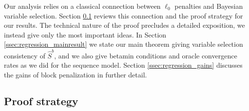 \documentclass[aos]{imsart}
\theoremstyle{plain}
\newcommand{\david}[1]{{\small{\color{blue} \sf $\heartsuit$ David: #1}}}
\newcommand{\paul}[1]{{\small{\color{green} \sf $\spadesuit$ Paul: #1}}}
\begin{document}
Our analysis relies on a classical connection
between $\ell_0$ penalties and Bayesian variable selection. 
Section \ref{ssec:regression_proof_strategy} reviews this connection and the proof strategy for our results.
The technical nature of the proof precludes a detailed exposition, we instead give only the most important ideas.
In Section \ref{ssec:regression_mainresult} we state our main theorem
giving variable selection consistency of $\hat{S}^{b}$, and we also give betamin conditions and oracle convergence rates as we did for the sequence model.
Section \ref{ssec:regression_gains} discusses the gains of block penalization in further detail.


\subsection{Proof strategy}
\label{ssec:regression_proof_strategy}
\end{document}
